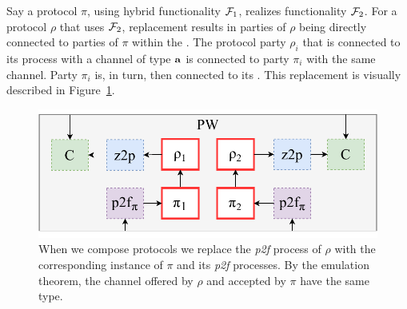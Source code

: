 Say a protocol $\pi$, using hybrid functionality $\mathcal{F}_1$, realizes functionality $\mathcal{F}_2$. 
For a protocol $\rho$ that uses $\mathcal{F}_2$, replacement results in parties of $\rho$ being directly connected to parties of $\pi$ within the \partywrapper.
The protocol party $\rho_i$ that is connected to its  process with a channel of type $\mathbf{a}$ is connected to party $\pi_i$ with the same channel.
Party $\pi_i$ is, in turn, then connected to its .
This replacement is visually described in Figure~\ref{fig:replacement}.

%


\begin{figure}
\centering
\includegraphics[scale=0.5]{figures/replacement2.pdf}
\caption{When we compose protocols we replace the \emph{p2f} process of $\rho$ with the corresponding instance of $\pi$ and its \emph{p2f} processes. By the emulation theorem, the channel offered by $\rho$ and accepted by $\pi$ have the same type.}
\label{fig:replacement}
\end{figure}

